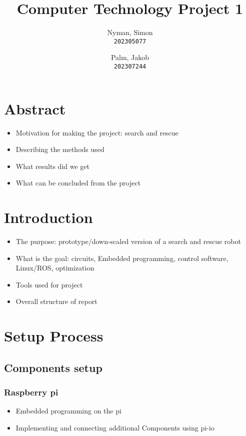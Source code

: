 \documentclass{article}
\author{
    Nyman, Simon\\
    \texttt{202305077}
    \and
    Palm, Jakob\\
    \texttt{202307244}
}
\begin{document}
\pagestyle{plain}
\title{Computer Technology Project 1}
\maketitle

    \section*{Abstract}
        \begin{itemize}
            \item Motivation for making the project: search and rescue
            \item Describing the methods used
            \item What results did we get
            \item What can be concluded from the project
        \end{itemize}

    \section*{Introduction}
        \begin{itemize}
            \item The purpose: prototype/down-scaled version of a search and rescue robot
            \item What is the goal: circuits, Embedded programming, control software, Linux/ROS, optimization
            \item Tools used for project
            \item Overall structure of report
        \end{itemize}

    \section*{Setup Process}
        \subsection*{Components setup}
            \subsubsection*{Raspberry pi}
                \begin{itemize}
                    \item Embedded programming on the pi
                    \item Implementing and connecting additional Components using pi-io 
                \end{itemize}
\end{document}
